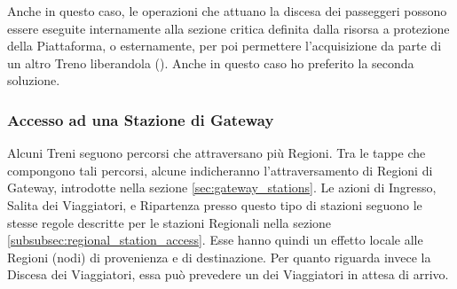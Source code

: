 	Anche in questo caso, le operazioni che attuano la discesa dei passeggeri possono essere eseguite internamente alla sezione critica definita dalla risorsa a protezione della Piattaforma, o esternamente, per poi permettere l'acquisizione da parte di un altro Treno liberandola (). Anche in questo caso ho preferito la seconda soluzione.


	\subsubsection{Accesso ad una Stazione di Gateway}\label{subsubsec:gateway_stations_func}
	
	Alcuni Treni seguono percorsi che attraversano più Regioni. Tra le tappe che compongono tali percorsi, alcune indicheranno l'attraversamento di Regioni di Gateway, introdotte nella sezione \ref{sec:gateway_stations}. 
	Le azioni di Ingresso, Salita dei Viaggiatori, e Ripartenza presso questo tipo di stazioni seguono le stesse regole descritte per le stazioni Regionali nella sezione \ref{subsubsec:regional_station_access}. Esse hanno quindi un effetto locale alle Regioni (nodi) di provenienza e di destinazione.
	Per quanto riguarda invece la Discesa dei Viaggiatori, essa può prevedere un  dei Viaggiatori in attesa di arrivo.
	
